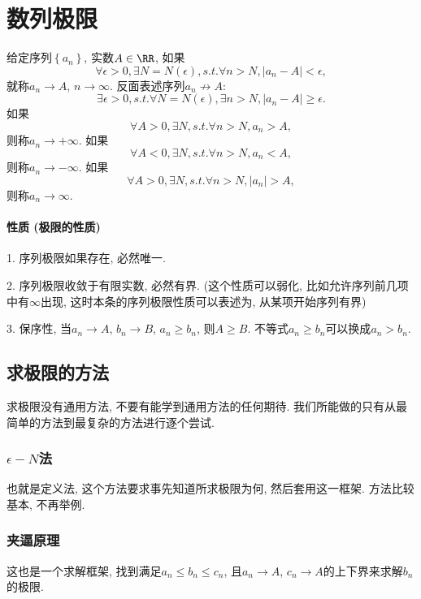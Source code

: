
\section{数列极限}
\begin{defn}
给定序列$\left\{ a_{n}\right\} $, 实数$A\in\RR$, 如果
\[
\forall\epsilon>0,\exists N=N(\epsilon),s.t.\forall n>N,\left|a_{n}-A\right|<\epsilon,
\]
就称$a_{n}\to A$, $n\to\infty$. 反面表述序列$a_{n}\not\to A$: 
\[
\exists\epsilon>0,s.t.\forall N=N(\epsilon),\exists n>N,\left|a_{n}-A\right|\ge\epsilon.
\]
如果
\[
\forall A>0,\exists N,s.t.\forall n>N,a_{n}>A,
\]
则称$a_{n}\to+\infty$. 如果
\[
\forall A<0,\exists N,s.t.\forall n>N,a_{n}<A,
\]
则称$a_{n}\to-\infty$. 如果
\[
\forall A>0,\exists N,s.t.\forall n>N,\left|a_{n}\right|>A,
\]
则称$a_{n}\to\infty$.
\end{defn}
%

\paragraph{性质 (极限的性质)}

1. 序列极限如果存在, 必然唯一.

2. 序列极限收敛于有限实数, 必然有界. (这个性质可以弱化, 比如允许序列前几项中有$\infty$出现, 这时本条的序列极限性质可以表述为,
从某项开始序列有界)

3. 保序性, 当$a_{n}\to A$, $b_{n}\to B$, $a_{n}\ge b_{n}$, 则$A\ge B$.
不等式$a_{n}\ge b_{n}$可以换成$a_{n}>b_{n}$.

\subsection{求极限的方法}

求极限没有通用方法, 不要有能学到通用方法的任何期待. 我们所能做的只有从最简单的方法到最复杂的方法进行逐个尝试.

\subsubsection{$\epsilon-N$法}

也就是定义法, 这个方法要求事先知道所求极限为何, 然后套用这一框架. 方法比较基本, 不再举例.

\subsubsection{夹逼原理}

这也是一个求解框架, 找到满足$a_{n}\le b_{n}\le c_{n}$, 且$a_{n}\to A$, $c_{n}\to A$的上下界来求解$b_{n}$的极限.

